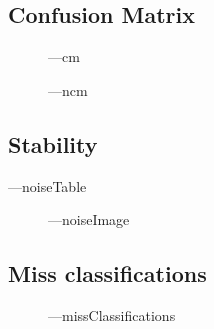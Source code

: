 \documentclass[11pt]{article}
\begin{document}
\subsection{Confusion Matrix}
\begin{figure}[H]
    \centering
    ---cm
\end{figure}
\begin{figure}[H]
    \centering
    ---ncm
\end{figure}
\subsection{Stability}
\begin{table}[H]
    \centering
    ---noiseTable
\end{table}  
\begin{figure}[H]
    \centering
    ---noiseImage
\end{figure}

\subsection{Miss classifications}
\begin{figure}[H]
    \centering
    ---missClassifications
\end{figure}
\end{document}
